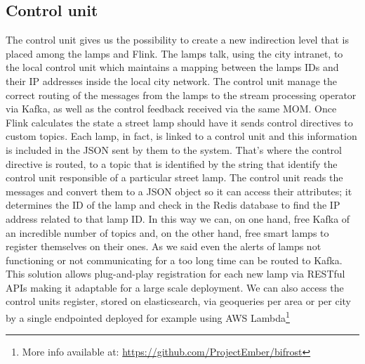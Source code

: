 \subsection{Control unit}
The control unit gives us the possibility to create a new indirection level that is placed among the lamps and Flink. The lamps talk, using the city intranet, to the local control unit which maintains a mapping between the lamps IDs and their IP addresses inside the local city network. The control unit manage the correct routing of the messages from the lamps to the stream processing operator via Kafka, as well as the control feedback received via the same MOM.
 Once Flink calculates the state a street lamp should have it sends control directives to custom topics. Each lamp, in fact, is linked to a control unit and this information is included in the JSON sent by them to the system. That’s where the control directive is routed, to a topic that is identified by the string that identify the control unit responsible of a particular street lamp. The control unit reads the messages and convert them to a JSON object so it can access their attributes; it determines the ID of the lamp and check in the Redis database to find the IP address related to that lamp ID.
In this way we can, on one hand, free Kafka of an incredible number of topics and, on the other hand, free smart lamps to register themselves on their ones. As we said even the alerts of lamps not functioning or not communicating for a too long time can be routed to Kafka. This solution allows plug-and-play registration for each new lamp via RESTful APIs making it adaptable for a large scale deployment. We can also access the control units register, stored on elasticsearch, via geoqueries per area or per city by a single endpointed deployed for example using AWS Lambda\footnote{More info available at: \url{https://github.com/ProjectEmber/bifrost}}

